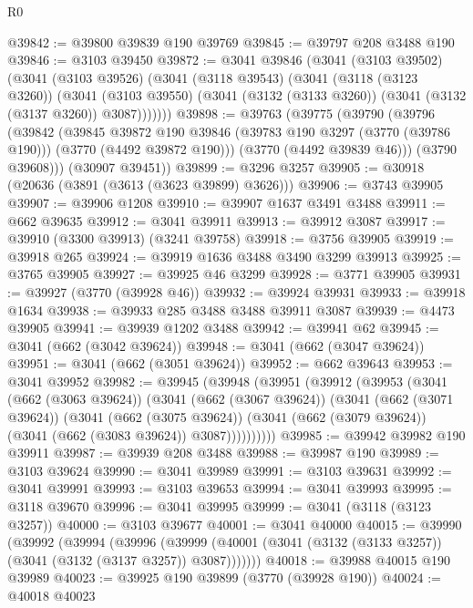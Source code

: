 \begin{lexlean}{R0}
\begin{coremodule}
@39842 := @39800 @39839 @190 @39769
@39845 := @39797 @208 @3488 @190
@39846 := @3103 @39450
@39872 := @3041
    @39846
    (@3041
      (@3103 @39502)
      (@3041
        (@3103 @39526)
        (@3041
          (@3118 @39543)
          (@3041
            (@3118 (@3123 @3260))
            (@3041
              (@3103 @39550)
              (@3041 (@3132 (@3133 @3260)) (@3041 (@3132 (@3137 @3260)) @3087)))))))
@39898 := @39763
    (@39775
      (@39790
        (@39796
          (@39842
            (@39845
              @39872
              @190
              @39846
              (@39783 @190 @3297 (@3770 (@39786 @190)))
              (@3770 (@4492 @39872 @190)))
            (@3770 (@4492 @39839 @46)))
          (@3790 @39608)))
      (@30907 @39451))
@39899 := @3296 @3257
@39905 := @30918 (@20636 (@3891 (@3613 (@3623 @39899) @3626)))
@39906 := @3743 @39905
@39907 := @39906 @1208
@39910 := @39907 @1637 @3491 @3488
@39911 := @662 @39635
@39912 := @3041 @39911
@39913 := @39912 @3087
@39917 := @39910 (@3300 @39913) (@3241 @39758)
@39918 := @3756 @39905
@39919 := @39918 @265
@39924 := @39919 @1636 @3488 @3490 @3299 @39913
@39925 := @3765 @39905
@39927 := @39925 @46 @3299
@39928 := @3771 @39905
@39931 := @39927 (@3770 (@39928 @46))
@39932 := @39924 @39931
@39933 := @39918 @1634
@39938 := @39933 @285 @3488 @3488 @39911 @3087
@39939 := @4473 @39905
@39941 := @39939 @1202 @3488
@39942 := @39941 @62
@39945 := @3041 (@662 (@3042 @39624))
@39948 := @3041 (@662 (@3047 @39624))
@39951 := @3041 (@662 (@3051 @39624))
@39952 := @662 @39643
@39953 := @3041 @39952
@39982 := @39945
    (@39948
      (@39951
        (@39912
          (@39953
            (@3041
              (@662 (@3063 @39624))
              (@3041
                (@662 (@3067 @39624))
                (@3041
                  (@662 (@3071 @39624))
                  (@3041
                    (@662 (@3075 @39624))
                    (@3041 (@662 (@3079 @39624)) (@3041 (@662 (@3083 @39624)) @3087))))))))))
@39985 := @39942 @39982 @190 @39911
@39987 := @39939 @208 @3488
@39988 := @39987 @190
@39989 := @3103 @39624
@39990 := @3041 @39989
@39991 := @3103 @39631
@39992 := @3041 @39991
@39993 := @3103 @39653
@39994 := @3041 @39993
@39995 := @3118 @39670
@39996 := @3041 @39995
@39999 := @3041 (@3118 (@3123 @3257))
@40000 := @3103 @39677
@40001 := @3041 @40000
@40015 := @39990
    (@39992
      (@39994
        (@39996
          (@39999 (@40001 (@3041 (@3132 (@3133 @3257)) (@3041 (@3132 (@3137 @3257)) @3087)))))))
@40018 := @39988 @40015 @190 @39989
@40023 := @39925 @190 @39899 (@3770 (@39928 @190))
@40024 := @40018 @40023

\end{coremodule}
\end{lexlean}

